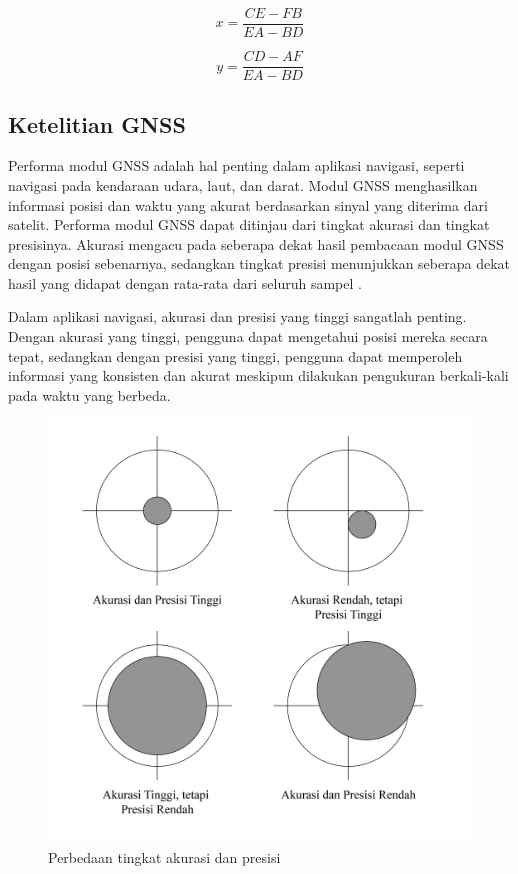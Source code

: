 \begin{equation}
	x = \frac{CE-FB}{EA-BD}
	\label{eq:2-12}
\end{equation}

\begin{equation}
	y = \frac{CD-AF}{EA-BD}
	\label{eq:2-13}
\end{equation}


\subsection{Ketelitian GNSS}
Performa modul GNSS adalah hal penting dalam aplikasi navigasi, seperti navigasi pada kendaraan udara, laut, dan darat. Modul GNSS menghasilkan informasi posisi dan waktu yang akurat berdasarkan sinyal yang diterima dari satelit. Performa modul GNSS dapat ditinjau dari tingkat akurasi dan tingkat presisinya. Akurasi mengacu pada seberapa dekat hasil pembacaan modul GNSS dengan posisi sebenarnya, sedangkan tingkat presisi menunjukkan seberapa dekat hasil yang didapat dengan rata-rata dari seluruh sampel \cite{Novatel2023}. 

Dalam aplikasi navigasi, akurasi dan presisi yang tinggi sangatlah penting. Dengan akurasi yang tinggi, pengguna dapat mengetahui posisi mereka secara tepat, sedangkan dengan presisi yang tinggi, pengguna dapat memperoleh informasi yang konsisten dan akurat meskipun dilakukan pengukuran berkali-kali pada waktu yang berbeda.

\begin{figure}[H]
	\centering
	\includegraphics[width=12cm]{contents/chapter-2/acc.png}
	\caption{Perbedaan tingkat akurasi dan presisi}
	\label{Fig: acc-and-prec-diff}
\end{figure}

